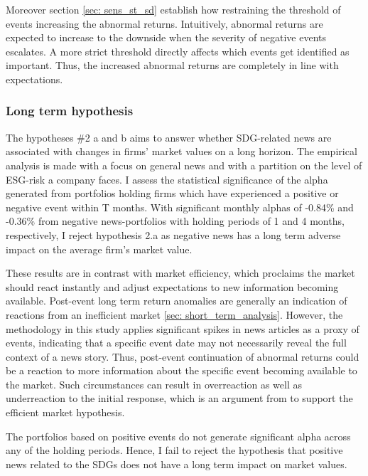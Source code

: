 Moreover section \ref{sec: sens_st_sd} establish how restraining the threshold of events increasing the abnormal returns. Intuitively, abnormal returns are expected to increase to the downside when the severity of negative events escalates. A more strict threshold directly affects which events get identified as important. Thus, the increased abnormal returns are completely in line with expectations.  




\subsubsection{Long term hypothesis}

The hypotheses \#2 a and b aims to answer whether SDG-related news are associated with changes in firms' market values on a long horizon. The empirical analysis is made with a focus on general news and with a partition on the level of ESG-risk a company faces. I assess the statistical significance of the alpha generated from portfolios holding firms which have experienced a positive or negative event within T months. With significant monthly alphas of -0.84\% and -0.36\% from negative news-portfolios with holding periods of 1 and 4 months, respectively, I reject hypothesis 2.a as negative news has a long term adverse impact on the average firm's market value.   

These results are in contrast with market efficiency, which proclaims the market should react instantly and adjust expectations to new information becoming available. Post-event long term return anomalies are generally an indication of reactions from an inefficient market \ref{sec: short_term_analysis}. However, the methodology in this study applies significant spikes in news articles as a proxy of events, indicating that a specific event date may not necessarily reveal the full context of a news story. Thus, post-event continuation of abnormal returns could be a reaction to more information about the specific event becoming available to the market. Such circumstances can result in overreaction as well as underreaction to the initial response, which is an argument from \cite{fama1998_events} to support the efficient market hypothesis.   

The portfolios based on positive events do not generate significant alpha across any of the holding periods. Hence, I fail to reject the hypothesis that positive news related to the SDGs does not have a long term impact on market values. 

